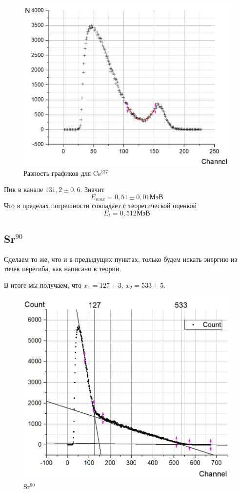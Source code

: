 \documentclass[a4paper, 12pt]{article}%
\begin{document}
\begin{figure}[h]
\begin{center}
\includegraphics[width = \textwidth]{10.jpg}
\caption{Разность графиков для Cs$^{137}$}
\end{center}
\end{figure}

Пик в канале $131,2\pm 0,6$. Значит
\[E_{max} = 0,51 \pm 0,01 \text{МэВ}\]
Что в пределах погрешности совпадает с теоретической оценкой 
\[E_t = 0,512 \text{МэВ}\]
\newpage
\subsection*{Sr$^{90}$}
Сделаем то же, что и в предыдущих пунктах, только будем искать энергию из точек перегиба, как написано в теории.

В итоге мы получаем, что $x_1 = 127 \pm 3$, $x_2 = 533 \pm 5$.

\begin{figure}[h]
\begin{center}
\includegraphics[width = \textwidth]{11.jpg}
\caption{Sr$^{90}$}
\end{center}
\end{figure}
\end{document}
